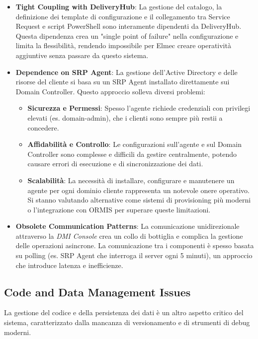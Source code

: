 \begin{itemize}
\item \textbf{Tight Coupling with DeliveryHub}: La gestione del catalogo, la definizione dei template di configurazione e il collegamento tra Service Request e script PowerShell sono interamente dipendenti da DeliveryHub. Questa dipendenza crea un "single point of failure" nella configurazione e limita la flessibilità, rendendo impossibile per Elmec creare operatività aggiuntive senza passare da questo sistema.
\item \textbf{Dependence on SRP Agent}: La gestione dell'Active Directory e delle risorse del cliente si basa su un SRP Agent installato direttamente sui Domain Controller. Questo approccio solleva diversi problemi:
\begin{itemize}
\item \textbf{Sicurezza e Permessi}: Spesso l'agente richiede credenziali con privilegi elevati (es. domain-admin), che i clienti sono sempre più restii a concedere.
\item \textbf{Affidabilità e Controllo}: Le configurazioni sull'agente e sul Domain Controller sono complesse e difficili da gestire centralmente, potendo causare errori di esecuzione e di sincronizzazione dei dati.
\item \textbf{Scalabilità}: La necessità di installare, configurare e manutenere un agente per ogni dominio cliente rappresenta un notevole onere operativo. Si stanno valutando alternative come sistemi di provisioning più moderni o l'integrazione con ORMIS per superare queste limitazioni.
\end{itemize}
\item \textbf{Obsolete Communication Patterns}: La comunicazione unidirezionale attraverso la \textit{DMI Console} crea un collo di bottiglia e complica la gestione delle operazioni asincrone. La comunicazione tra i componenti è spesso basata su polling (es. SRP Agent che interroga il server ogni 5 minuti), un approccio che introduce latenza e inefficienze.
\end{itemize}

\subsection{Code and Data Management Issues}

La gestione del codice e della persistenza dei dati è un altro aspetto critico del sistema, caratterizzato dalla mancanza di versionamento e di strumenti di debug moderni.

